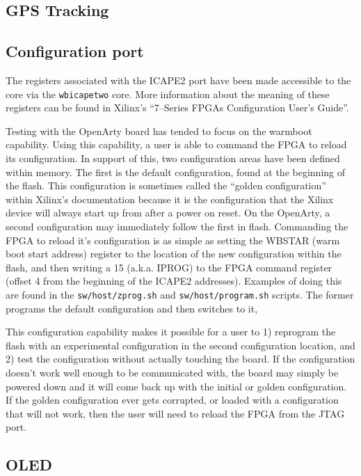 \documentclass{gqtekspec}
\begin{document}
\subsection{GPS Tracking}
\subsection{Configuration port}

The registers associated with the ICAPE2 port have been made accessible
to the core via the {\tt wbicapetwo} core.  More information about the meaning
of these registers can be found in Xilinx's ``7--Series FPGAs Configuration
User's Guide''.  

Testing with the OpenArty board has tended to focus on the warmboot capability.
Using this capability, a user is able to command the FPGA to reload its
configuration.  In support of this, two configuration areas have been 
defined within memory.  The first is the default configuration, found at
the beginning of the flash.  This configuration is sometimes called the ``golden
configuration'' within Xilinx's documentation because it is the configuration
that the Xilinx device will always start up from after a power on reset.  On
the OpenArty, a second configuration may immediately follow the first in flash. 
Commanding the FPGA to reload it's configuration is as simple as
setting the WBSTAR (warm boot start address) register to the location of the
new configuration within the flash, and then writing a 15 (a.k.a. IPROG)
to the FPGA command register (offset 4 from the beginning of the ICAPE2
addresses).  Examples of doing this are found in the 
{\tt sw/host/zprog.sh} and {\tt sw/host/program.sh} scripts.  The former
programs the default configuration and then switches to it, 

This configuration capability makes it possible for a user to 1) reprogram
the flash with an experimental configuration in the second configuration
location, and 2) test the configuration without actually touching the board. 
If the configuration doesn't work well enough to be communicated with, the
board may simply be powered down and it will come back up with the initial
or golden configuration.  If the golden configuration ever gets corrupted,
or loaded with a configuration that will not work, then the user will need to
reload the FPGA from the JTAG port.

\subsection{OLED}
\end{document}
